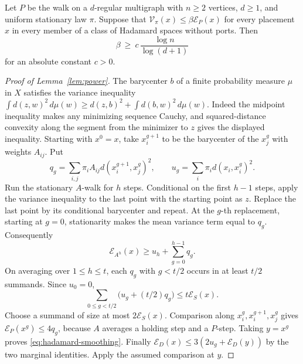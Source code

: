 \begin{theorem}\label{thm:loggraph}
Let \(P\) be the walk on a \(d\)-regular multigraph with \(n\ge2\)
vertices, \(d\ge1\), and uniform stationary law \(\pi\). Suppose
that \(\mathcal V_\pi(x)\le\beta\mathcal E_P(x)\) for every
placement \(x\) in every member of a class of Hadamard spaces
without ports. Then
\[
                 \beta\ \ge\ c\,\frac{\log n}{\log(d+1)}
\]
for an absolute constant \(c>0\).
\end{theorem}

\begin{proof}[Proof of Lemma~\ref{lem:power}]
The barycenter \(b\) of a finite probability measure \(\mu\) in \(X\)
satisfies the variance inequality
\(\int d(z,w)^2\,d\mu(w)\ge d(z,b)^2+\int d(b,w)^2\,d\mu(w)\).
Indeed the midpoint inequality makes any minimizing sequence Cauchy,
and squared-distance convexity along the segment from the minimizer
to \(z\) gives the displayed inequality.
Starting with \(x^0=x\), take \(x_i^{g+1}\) to be the barycenter of the
\(x_j^g\) with weights \(A_{ij}\). Put
\[
 q_g=\sum_{i,j}\pi_iA_{ij}d(x_i^{g+1},x_j^g)^2,\qquad
 u_g=\sum_i\pi_i d(x_i,x_i^g)^2 .
\]
Run the stationary \(A\)-walk for \(h\) steps. Conditional on the first
\(h-1\) steps, apply the variance inequality to the last point with
the starting point as \(z\). Replace the last point by its conditional
barycenter and repeat. At the \(g\)-th replacement, starting at
\(g=0\), stationarity makes the mean variance term equal to \(q_g\).
Consequently
\[
 \mathcal E_{A^h}(x)\ge u_h+\sum_{g=0}^{h-1}q_g .
\]
On averaging over \(1\le h\le t\), each \(q_g\) with \(g<t/2\)
occurs in at least \(t/2\) summands. Since \(u_0=0\),
\[
 \sum_{0\le g<t/2}\bigl(u_g+(t/2)q_g\bigr)\le t\mathcal E_S(x).
\]
Choose a summand of size at most \(2\mathcal E_S(x)\).
Comparison along \(x_i^g,x_i^{g+1},x_j^g\) gives
\(\mathcal E_P(x^g)\le4q_g\), because \(A\) averages a holding step
and a \(P\)-step. Taking \(y=x^g\) proves \eqref{eq:hadamard-smoothing}.
Finally
\(\mathcal E_D(x)\le3(2u_g+\mathcal E_D(y))\) by the two marginal
identities. Apply the assumed comparison at \(y\).
\end{proof}

